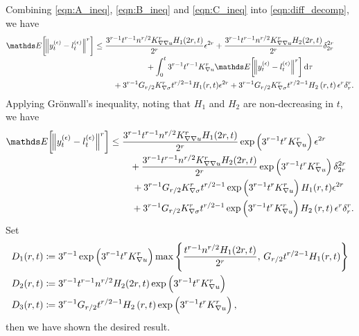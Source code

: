 Combining \eqref{eqn:A_ineq}, \eqref{eqn:B_ineq} and \eqref{eqn:C_ineq} into \eqref{eqn:diff_decomp}, we have
\[
	\avg{\norm{y_t^{(\epsilon)} - l_t^{(\epsilon)}}^r} \leq \begin{multlined}[t]
		\frac{3^{r-1} t^{r-1}n^{r/2}K_{\nabla\nabla u}^r H_1(2r, t)}{2^r}\epsilon^{2r} + \frac{3^{r-1} t^{r-1} n^{r/2} K_{\nabla\nabla u}^r H_2(2r, t)}{2^r}\delta_{2r}^{2r} \\
		+ \int_0^t{3^{r-1}t^{r-1}K_{\nabla u}^r\avg{\norm{y_t^{(\epsilon)} - l_t^{(\epsilon)}}^r}\dif\tau} \\
		+ 3^{r-1}G_{r/2} K_{\nabla\sigma}^r t^{r/2 - 1} H_1(r, t)\epsilon^{2r} + 3^{r-1} G_{r/2} K_{\nabla\sigma}^r t^{r/2 - 1} H_2\left(r,t\right)\epsilon^r\delta_r^r.
	\end{multlined}
\]
Applying Gr\"{o}nwall's inequality, noting that \(H_1\) and \(H_2\) are non-decreasing in \(t\), we have
\[
	\avg{\norm{y_t^{(\epsilon)} - l_t^{(\epsilon)}}^r} \leq \begin{multlined}[t]
		\frac{3^{r-1} t^{r-1}n^{r/2}K_{\nabla\nabla u}^r H_1(2r, t)}{2^r}\exp\left(3^{r-1}t^r K_{\nabla u}^r\right)\epsilon^{2r} \\
		+ \frac{3^{r-1} t^{r-1} n^{r/2} K_{\nabla\nabla u}^r H_2(2r, t)}{2^r}\exp\left(3^{r-1}t^r K_{\nabla u}^r\right)\delta_{2r}^{2r} \\
		+ 3^{r-1}G_{r/2} K_{\nabla\sigma}^r t^{r/2 - 1}\exp\left(3^{r-1}t^r K_{\nabla u}^r\right) H_1(r, t)\epsilon^{2r} \\
		+ 3^{r-1} G_{r/2} K_{\nabla\sigma}^r t^{r/2 - 1}\exp\left(3^{r-1}t^r K_{\nabla u}^r\right) H_2\left(r,t\right)\epsilon^r\delta_r^r.
	\end{multlined}
\]
Set
\begin{subequations}\label{eqn:bound_defns}
	\begin{align}
		D_1(r,t) & \coloneqq 3^{r-1}\exp\left(3^{r-1} t^r K_{\nabla u}^r\right)\max\set{\frac{t^{r-1}n^{r/2}H_{1}(2r, t)}{2^r},\, G_{r/2} t^{r/2 - 1} H_1(r, t)} \\
		D_2(r,t) & \coloneqq 3^{r-1}t^{r-1} n^{r/2}H_{2}(2r, t)\exp\left(3^{r-1}t^r K_{\nabla u}^r\right)                                                        \\
		D_3(r,t) & \coloneqq 3^{r-1}G_{r/2} t^{r/2 - 1} H_2\left(r,t\right)\exp\left(3^{r-1}t^r K_{\nabla u}^r\right),
	\end{align}
\end{subequations}
then we have shown the desired result.


